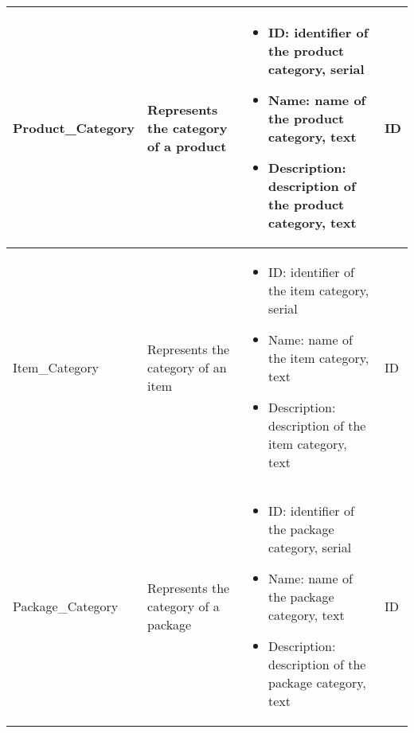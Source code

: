 \begin{longtable}{|p{}|p{} |p{}|p{} |}
    Product\_Category & Represents the category of a product &
        \begin{itemize}
            \vspace{-1em}
            \item ID:   identifier of the product category, serial
            \item Name:   name of the product category, text
            \item Description:   description of the product category, text
        \end{itemize}
    &  ID \\\hline

    Item\_Category & Represents the category of an item &
        \begin{itemize}
            \vspace{-1em}
            \item ID:   identifier of the item category, serial
            \item Name:   name of the item category, text
            \item Description:   description of the item category, text
        \end{itemize}
    &  ID \\\hline

    Package\_Category & Represents the category of a package &
        \begin{itemize}
            \vspace{-1em}
            \item ID:   identifier of the package category, serial
            \item Name:   name of the package category, text
            \item Description:   description of the package category, text
        \end{itemize}
    &  ID \\\hline

\end{longtable}